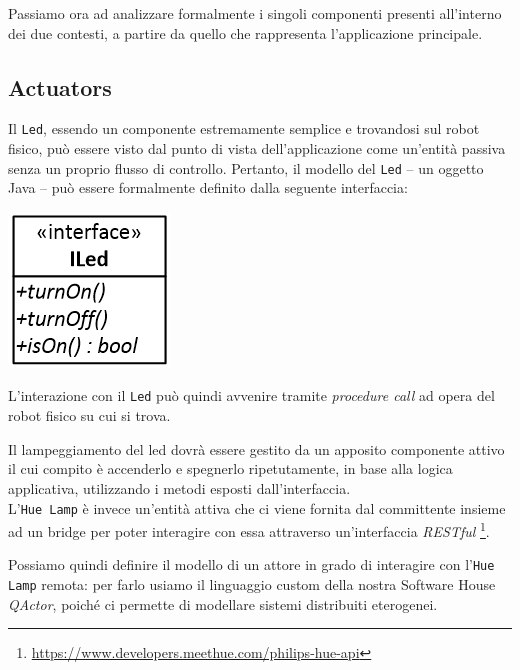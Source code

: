 \documentclass{../llncs}
\newcommand{\qa}{\textsf{\textit{QActor}}\xspace}
\newcommand{\labelssec}[1]{\label{ssec:#1}}
\begin{document}
\vspace{8px}

Passiamo ora ad analizzare formalmente i singoli componenti presenti all'interno dei due contesti, a partire da quello che rappresenta l'applicazione principale.

\subsection{Actuators}
\labelssec{actuatorsRA}
Il \texttt{Led}, essendo un componente estremamente semplice e trovandosi sul robot fisico, può essere visto dal punto di vista dell'applicazione come un'entità passiva senza un proprio flusso di controllo. Pertanto, il modello del \texttt{Led} -- un oggetto Java -- può essere formalmente definito dalla seguente interfaccia:

\begin{center}
\includegraphics[scale=0.4]{img/iled.png}
\end{center}

L'interazione con il \texttt{Led} può quindi avvenire tramite \textit{procedure call} ad opera del robot fisico su cui si trova.

Il lampeggiamento del led dovrà essere gestito da un apposito componente attivo il cui compito è accenderlo e spegnerlo ripetutamente, in base alla logica applicativa, utilizzando i metodi esposti dall'interfaccia.\\

L'\texttt{Hue Lamp} è invece un'entità attiva che ci viene fornita dal committente insieme ad un bridge per poter interagire con essa attraverso un'interfaccia \textit{RESTful}
\footnote{\url{https://www.developers.meethue.com/philips-hue-api}}.

Possiamo quindi definire il modello di un attore in grado di interagire con l'\texttt{Hue Lamp} remota: per farlo usiamo il linguaggio custom della nostra Software House \qa, poiché ci permette di modellare sistemi distribuiti eterogenei.\\


\end{document}
